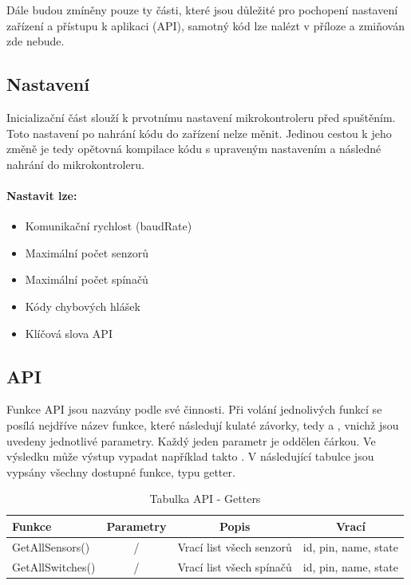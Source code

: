 \documentclass[FM,DP]{tulthesis}  %
\begin{document}
Dále budou zmíněny pouze ty části, které jsou důležité pro pochopení nastavení zařízení a přístupu k aplikaci (API), samotný kód lze nalézt v příloze a zmiňován zde nebude.

\subsection{Nastavení}
Inicializační část slouží k prvotnímu nastavení mikrokontroleru před spuštěním. Toto nastavení po nahrání kódu do zařízení nelze měnit. Jedinou cestou k jeho změně je tedy opětovná kompilace kódu s upraveným nastavením a následné nahrání do mikrokontroleru.

\paragraph{Nastavit lze:}
\begin{itemize}
\item Komunikační rychlost (baudRate)
\item Maximální počet senzorů
\item Maximální počet spínačů
\item Kódy chybových hlášek
\item Klíčová slova API
\end{itemize} 

\subsection{API}
Funkce API jsou nazvány podle své činnosti. Při volání jednolivých funkcí se posílá nejdříve název funkce, které následují kulaté závorky, tedy \uv{(} a \uv{)}, vnichž jsou uvedeny jednotlivé parametry. Každý jeden parametr je oddělen čárkou. Ve výsledku může výstup vypadat například takto . V následující tabulce jsou vypsány všechny dostupné funkce, typu getter.

\renewcommand{\arraystretch}{1.5}
\begin{table}[H]
\begin{center}
\begin{tabular}{| l | c | c| c |}
\hline
Funkce & Parametry & Popis & Vrací\\
\hline
\hline
GetAllSensors() & / & Vrací list všech senzorů & id, pin, name, state \\
\hline
GetAllSwitches() & / & Vrací list všech spínačů & id, pin, name, state \\
\hline
\end{tabular}
\end{center}
\caption{Tabulka API - Getters}
\end{table}
\end{document}
